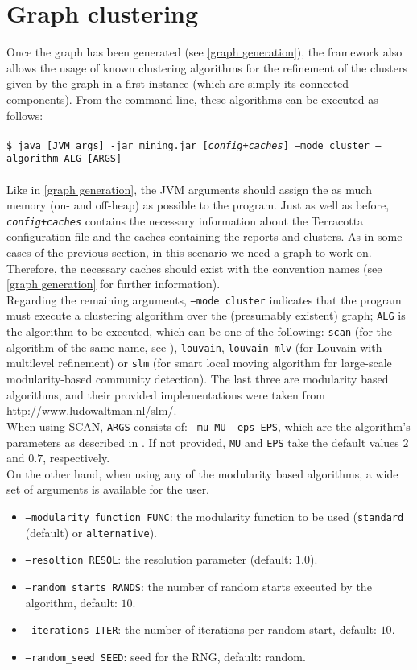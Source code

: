 \documentclass{article}
\begin{document}
	\section{Graph clustering}
	\label{graph clustering}
		Once the graph has been generated (see \ref{graph generation}), the framework also allows the 
		usage of known clustering algorithms for the refinement of the clusters given by the graph
		in a first instance (which are simply its connected components). From the command line, these
		algorithms can be executed as follows:\\ \\
		\texttt{\$ java [JVM args] -jar mining.jar [\emph{config+caches}] --mode cluster --algorithm ALG [ARGS]}\\ \\
		Like in \ref{graph generation}, the JVM arguments should assign the as much memory (on- and off-heap)
		as possible to the program. Just as well as before, \texttt{\emph{config+caches}} contains 
		the necessary information about the Terracotta configuration file and the caches containing 
		the reports and clusters. As in some cases of the previous section, in this scenario we need 
		a graph to work on. Therefore, the necessary caches should exist with the convention names 
		(see \ref{graph generation} for further information).\\
		Regarding the remaining arguments, \texttt{--mode cluster} indicates that the program must 
		execute a clustering algorithm over the (presumably existent) graph; \texttt{ALG} is the
		algorithm to be executed, which can be one of the following: \texttt{scan} (for the algorithm 
		of the same name, see \cite{X07}), \texttt{louvain}, \texttt{louvain\_mlv} (for Louvain with 
		multilevel refinement) or \texttt{slm} (for smart local moving algorithm for large-scale 
		modularity-based community detection). The last three are modularity based algorithms, and 
		their provided implementations were taken from \url{http://www.ludowaltman.nl/slm/}.\\
		When using SCAN, \texttt{ARGS} consists of: \texttt{--mu MU --eps EPS}, which are the 
		algorithm's parameters as described in \cite{X07}. If not provided, \texttt{MU} and \texttt{EPS}
		take the default values $2$ and $0.7$, respectively.\\
		On the other hand, when using any of the modularity based algorithms, a wide set of arguments
		is available for the user. 
		\begin{itemize}
			\item \texttt{--modularity\_function FUNC}: the modularity function to be used (\texttt{standard} (default) or \texttt{alternative}).
			\item \texttt{--resoltion RESOL}: the resolution parameter (default: $1.0$).
			\item \texttt{--random\_starts RANDS}: the number of random starts executed by the algorithm, default: $10$.
			\item \texttt{--iterations ITER}: the number of iterations per random start, default: $10$.
			\item \texttt{--random\_seed SEED}: seed for the RNG, default: random.
		\end{itemize}
\end{document}

